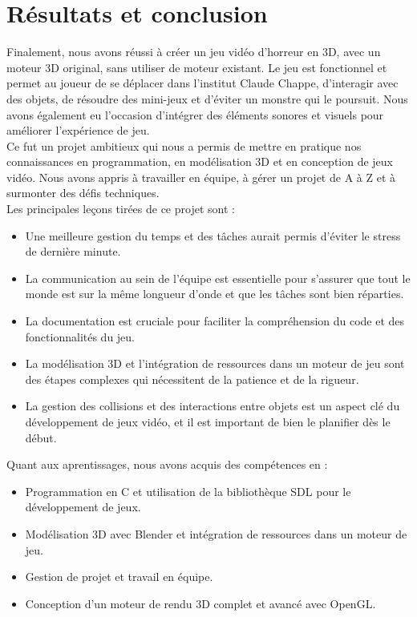 \section{Résultats et conclusion}

Finalement, nous avons réussi à créer un jeu vidéo d'horreur en 3D, avec un moteur
3D original, sans utiliser de moteur existant. Le jeu est fonctionnel et
permet au joueur de se déplacer dans l'institut Claude Chappe, d'interagir avec
des objets, de résoudre des mini-jeux et d'éviter un monstre qui le poursuit.
Nous avons également eu l'occasion d'intégrer des éléments sonores et visuels pour
améliorer l'expérience de jeu.\\

Ce fut un projet ambitieux qui nous a permis de mettre en pratique nos
connaissances en programmation, en modélisation 3D et en conception de jeux vidéo.
Nous avons appris à travailler en équipe, à gérer un projet de A à Z et à surmonter
des défis techniques.\\

Les principales leçons tirées de ce projet sont :\\
\begin{itemize}
    \item Une meilleure gestion du temps et des tâches aurait permis d'éviter le stress
    de dernière minute.
    \item La communication au sein de l'équipe est essentielle pour s'assurer que tout le monde
    est sur la même longueur d'onde et que les tâches sont bien réparties.
    \item La documentation est cruciale pour faciliter la compréhension du code et des
    fonctionnalités du jeu.
    \item La modélisation 3D et l'intégration de ressources dans un moteur de jeu sont des
    étapes complexes qui nécessitent de la patience et de la rigueur.
    \item La gestion des collisions et des interactions entre objets est un aspect clé du
    développement de jeux vidéo, et il est important de bien le planifier dès le début.
\end{itemize}

Quant aux aprentissages, nous avons acquis des compétences en :\\
\begin{itemize}
    \item Programmation en C et utilisation de la bibliothèque SDL pour le développement de jeux.
    \item Modélisation 3D avec Blender et intégration de ressources dans un moteur de jeu.
    \item Gestion de projet et travail en équipe.
    \item Conception d'un moteur de rendu 3D complet et avancé avec OpenGL.
\end{itemize}